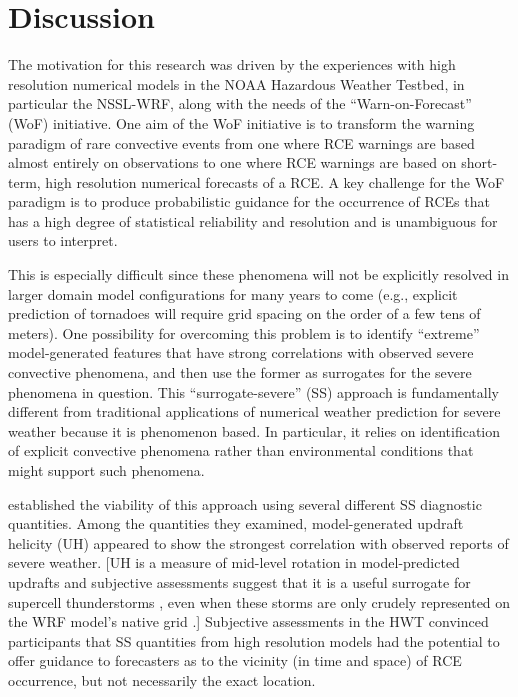 

\chapter{Discussion}
\label{discussion}


The motivation for this research was driven by the experiences with high resolution numerical models in the NOAA Hazardous Weather Testbed, in particular the NSSL-WRF, along with the needs of the ``Warn-on-Forecast'' (WoF) initiative.
One aim of the WoF initiative is to transform the warning paradigm of rare convective events from one where RCE warnings are based almost entirely on observations to one where RCE warnings are based on short-term, high resolution numerical forecasts of a RCE.
A key challenge for the WoF paradigm is to produce probabilistic guidance for the occurrence of RCEs that has a high degree of statistical reliability and resolution and is unambiguous for users to interpret.


This is especially difficult since these phenomena will not be explicitly resolved in larger domain model configurations for many years to come (e.g., explicit prediction of tornadoes will require grid spacing on the order of a few tens of meters).
One possibility for overcoming this problem is to identify ``extreme'' model-generated features that have strong correlations with observed severe convective phenomena, and then use the former as surrogates for the severe phenomena in question.
This ``surrogate-severe'' (SS) approach is fundamentally different from traditional applications of numerical weather prediction for severe weather because it is phenomenon based.
In particular, it relies on identification of explicit convective phenomena rather than environmental conditions that might support such phenomena.


\cite{Sobash2011} established the viability of this approach using several different SS diagnostic quantities.
Among the quantities they examined, model-generated updraft helicity (UH) appeared to show the strongest correlation with observed reports of severe weather.
[UH is a measure of mid-level rotation in model-predicted updrafts and subjective assessments suggest that it is a useful surrogate for supercell thunderstorms \citep{Kain2010}, even when these storms are only crudely represented on the WRF model's native grid \citep{Kain2008}.]
Subjective assessments in the HWT convinced participants that SS quantities from high resolution models had the potential to offer guidance to forecasters as to the vicinity (in time and space) of RCE occurrence, but not necessarily the exact location.


